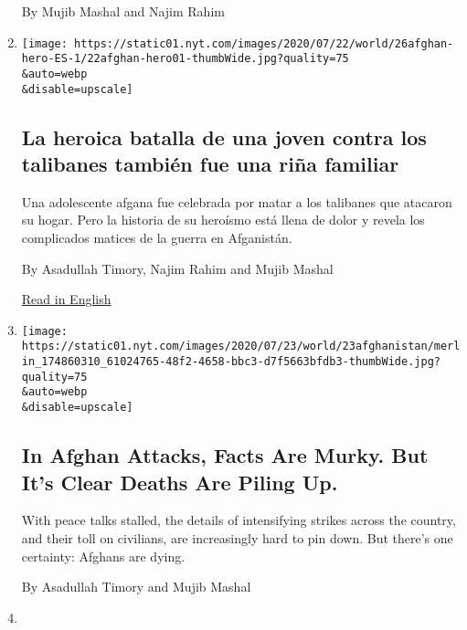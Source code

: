 \begin{enumerate}
  By Mujib Mashal and Najim Rahim
\item
  \href{/es/2020/07/26/espanol/mundo/guerra-afganistan-mujeres.html}{}

  \texttt{[image: https://static01.nyt.com/images/2020/07/22/world/26afghan-hero-ES-1/22afghan-hero01-thumbWide.jpg?quality=75\\\&auto=webp\\\&disable=upscale]}

  \hypertarget{la-heroica-batalla-de-una-joven-contra-los-talibanes-tambiuxe9n-fue-una-riuxf1a-familiar}{%
  \subsection{La heroica batalla de una joven contra los talibanes
  también fue una riña
  familiar}\label{la-heroica-batalla-de-una-joven-contra-los-talibanes-tambiuxe9n-fue-una-riuxf1a-familiar}}

  Una adolescente afgana fue celebrada por matar a los talibanes que
  atacaron su hogar. Pero la historia de su heroísmo está llena de dolor
  y revela los complicados matices de la guerra en Afganistán.

  By Asadullah Timory, Najim Rahim and Mujib Mashal

  \href{https://www.nytimes.com/2020/07/22/world/asia/afghan-hero-woman-taliban.html}{Read
  in English}
\item
  \href{/2020/07/23/world/asia/afghan-taliban-violence-airstrikes.html}{}

  \texttt{[image: https://static01.nyt.com/images/2020/07/23/world/23afghanistan/merlin\_174860310\_61024765-48f2-4658-bbc3-d7f5663bfdb3-thumbWide.jpg?quality=75\\\&auto=webp\\\&disable=upscale]}

  \hypertarget{in-afghan-attacks-facts-are-murky-but-its-clear-deaths-are-piling-up}{%
  \subsection{In Afghan Attacks, Facts Are Murky. But It's Clear Deaths
  Are Piling
  Up.}\label{in-afghan-attacks-facts-are-murky-but-its-clear-deaths-are-piling-up}}

  With peace talks stalled, the details of intensifying strikes across
  the country, and their toll on civilians, are increasingly hard to pin
  down. But there's one certainty: Afghans are dying.

  By Asadullah Timory and Mujib Mashal
\item
  \href{/2020/07/22/world/asia/afghan-hero-woman-taliban.html}{}


\end{enumerate}

